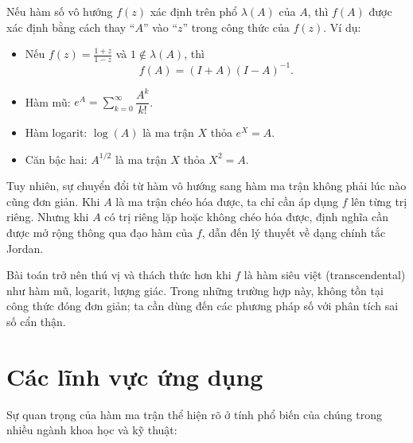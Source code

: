 \documentclass[12pt,a4paper]{report}
\begin{document}
Nếu hàm số vô hướng $f(z)$ xác định trên phổ $\lambda(A)$ của $A$, thì $f(A)$ được
xác định bằng cách thay ``$A$'' vào ``$z$'' trong công thức của $f(z)$. Ví dụ:
\begin{itemize}
  \item Nếu $f(z) = \frac{1+z}{1-z}$ và $1 \notin \lambda(A)$, thì
        \[
          f(A) = (I+A)(I-A)^{-1}.
        \]
  \item Hàm mũ: $e^A = \sum_{k=0}^{\infty} \dfrac{A^k}{k!}$.
  \item Hàm logarit: $\log(A)$ là ma trận $X$ thỏa $e^X = A$.
  \item Căn bậc hai: $A^{1/2}$ là ma trận $X$ thỏa $X^2 = A$.
\end{itemize}

Tuy nhiên, sự chuyển đổi từ hàm vô hướng sang hàm ma trận không phải lúc nào cũng
đơn giản. Khi $A$ là ma trận chéo hóa được, ta chỉ cần áp dụng $f$ lên từng trị
riêng. Nhưng khi $A$ có trị riêng lặp hoặc không chéo hóa được, định nghĩa cần
được mở rộng thông qua đạo hàm của $f$, dẫn đến lý thuyết về dạng chính tắc Jordan.

Bài toán trở nên thú vị và thách thức hơn khi $f$ là hàm siêu việt (transcendental)
như hàm mũ, logarit, lượng giác. Trong những trường hợp này, không tồn tại công
thức đóng đơn giản; ta cần dùng đến các phương pháp số với phân tích sai số cẩn thận.

\section*{Các lĩnh vực ứng dụng}

Sự quan trọng của hàm ma trận thể hiện rõ ở tính phổ biến của chúng trong nhiều
ngành khoa học và kỹ thuật:
\end{document}
